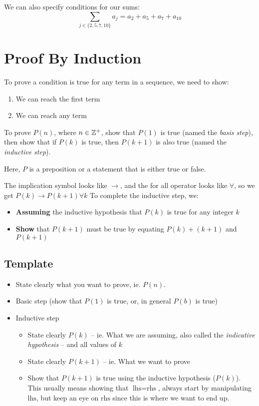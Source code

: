 \begin{note}
    We can also specify conditions for our sums:
    \[
        \sum_{j\in \{2, 5, 7, 10\} } a_j = a_2 + a_5 + a_7 + a_10
    \]
\end{note}

\section{Proof By Induction}\label{sec:proof_by_induction}

To prove a condition is true for any term in a sequence, we need to show:
\begin{enumerate}
    \item We can reach the first term
    \item We can reach any term
\end{enumerate}
To prove \(P(n)\), where \(n\in \mathbb{Z}^{+}\), show that \(P(1)\) is true (named the \emph{basis step}), then show that if \(P(k)\) is true, then \(P(k+1)\) is also true (named the \emph{inductive step}).
\begin{note}
    Here, \(P\) is a preposition or a statement that is either true or false.
\end{note}
The implication symbol looks like \(\to\), and the for all operator looks like \(\forall\), so we get \(P(k) \to P(k+1) \forall k\)
To complete the inductive step, we:
\begin{itemize}
    \item \textbf{Assuming} the inductive hypothesis that \(P(k)\) is true for any integer \(k\)
    \item \textbf{Show} that \(P(k+1)\) must be true by equating \(P(k) + (k+1)\) and \(P(k+1)\)
\end{itemize}

\subsection{Template}\label{sub:template}

\begin{itemize}
    \item State clearly what you want to prove, ie. \(P(n)\).
    \item Basic step (show that \(P(1)\) is true, or, in general \(P(b)\) is true)
    \item Inductive step
          \begin{itemize}
              \item State clearly \(P(k)\) -- ie. What we are assuming, also called the \emph{indicative hypothesis} -- and all values of \(k\)
              \item State clearly \(P(k+1)\) -- ie. What we want to prove
              \item Show that \(P(k+1)\) is true using the inductive hypothesis (\(P(k)\)). This usually means showing that \(\text{lhs} = \text{rhs}\), always start by manipulating \(\text{lhs}\), but keep an eye on \(\text{rhs}\) since this is where we want to end up.
          \end{itemize}
\end{itemize}
